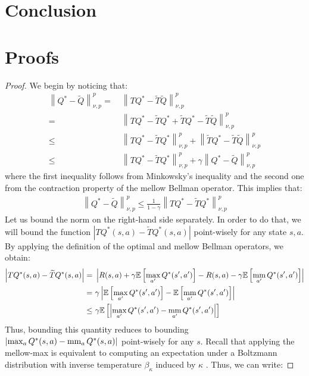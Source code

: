 \documentclass{article}
\newcommand{\mm}{\operatornamewithlimits{mm}}
\newcommand{\wt}[1]{\widetilde{#1}}
\newcommand{\norm}[1]{\left\lVert #1 \right\rVert}
\newcommand{\abs}[1]{\left\lvert #1 \right\rvert}
\begin{document}
\section{Conclusion}

{\small 


}

\newpage
\appendix

\section{Proofs}

\thmm*
\begin{proof}
We begin by noticing that:
\begin{align*}
\norm{Q^*-\wt{Q}}_{\nu,p}^p =\ & \norm{TQ^* - \wt{T}\wt{Q}}_{\nu,p}^p \\ =\ &
\norm{TQ^* - \wt{T}Q^* + \wt{T}Q^* - \wt{T}\wt{Q}}_{\nu,p}^p \\ \leq\ &
\norm{TQ^* - \wt{T}Q^*}_{\nu,p}^p + \norm{\wt{T}Q^* - \wt{T}\wt{Q}}_{\nu,p}^p \\ \leq\ &
\norm{TQ^* - \wt{T}Q^*}_{\nu,p}^p + \gamma\norm{Q^* - \wt{Q}}_{\nu,p}^p
\end{align*}
where the first inequality follows from Minkowsky's inequality and the second one from the contraction property of the mellow Bellman operator. This implies that:
\begin{align} \label{eq:mm1}
\norm{Q^*-\wt{Q}}_{\nu,p}^p \leq \frac{1}{1-\gamma}\norm{TQ^* - \wt{T}Q^*}_{\nu,p}^p
\end{align}
Let us bound the norm on the right-hand side separately. In order to do that, we will bound the function $\abs{TQ^*(s,a) - \wt{T}Q^*(s,a)}$ point-wisely for any state $s,a$. By applying the definition of the optimal and mellow Bellman operators, we obtain:
\begin{align} \label{eq:mm5}
\abs{TQ^*(s,a) - \wt{T}Q^*(s,a)} =\ & \abs{R(s,a) + \gamma\mathbb{E}\left[\max_{a'}Q^*(s',a')\right] - R(s,a) - \gamma\mathbb{E}\left[\mm_{a'}Q^*(s',a')\right]}\notag \\ =\ & \gamma\abs{\mathbb{E}\left[\max_{a'}Q^*(s',a')\right] - \mathbb{E}\left[\mm_{a'}Q^*(s',a')\right]}\notag \\ \leq\ & \gamma\mathbb{E}\left[\abs{\max_{a'}Q^*(s',a') - \mm_{a'}Q^*(s',a')}\right]
\end{align}
Thus, bounding this quantity reduces to bounding $\abs{\max_{a}Q^*(s,a) - \mm_{a}Q^*(s,a)}$ point-wisely for any $s$. Recall that applying the mellow-max is equivalent to computing an expectation under a Boltzmann distribution with inverse temperature $\beta_{\kappa}$ induced by $\kappa$ \cite{}. Thus, we can write:

\end{proof}
\end{document}
